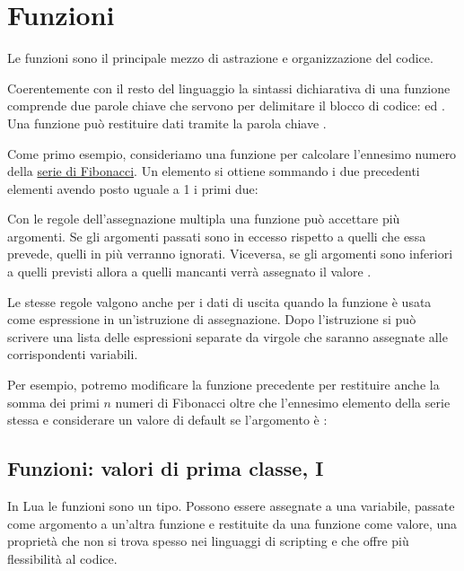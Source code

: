 
\chapter{Funzioni}
\label{iiChFunzioni}

Le funzioni sono il principale mezzo di astrazione e organizzazione del codice.

Coerentemente con il resto del linguaggio la sintassi dichiarativa di una
funzione comprende due parole chiave che servono per delimitare il blocco di
codice:  ed . Una funzione può restituire dati tramite la
parola chiave .

Come primo esempio, consideriamo una funzione per calcolare l'ennesimo numero
della \href{http://it.wikipedia.org/wiki/Successione_di_Fibonacci}{serie di
Fibonacci}. Un elemento si ottiene sommando i due precedenti elementi avendo
posto uguale a 1 i primi due:

Con le regole dell'assegnazione multipla una funzione può accettare più
argomenti. Se gli argomenti passati sono in eccesso rispetto a quelli che essa
prevede, quelli in più verranno ignorati. Viceversa, se gli argomenti sono
inferiori a quelli previsti allora a quelli mancanti verrà assegnato il valore
.

Le stesse regole valgono anche per i dati di uscita quando la funzione è usata
come espressione in un'istruzione di assegnazione. Dopo l'istruzione
 si può scrivere una lista delle espressioni separate
da virgole che saranno assegnate alle corrispondenti variabili.

Per esempio, potremo modificare la funzione precedente per restituire anche la
somma dei primi \( n \) numeri di Fibonacci oltre che l'ennesimo elemento della
serie stessa e considerare un valore di default se l'argomento è :


\section{Funzioni: valori di prima classe, I}

In Lua le funzioni sono un tipo. Possono essere assegnate a una variabile,
passate come argomento a un'altra funzione e restituite da una funzione come
valore, una proprietà che non si trova spesso nei linguaggi di scripting e che
offre più flessibilità al codice.

